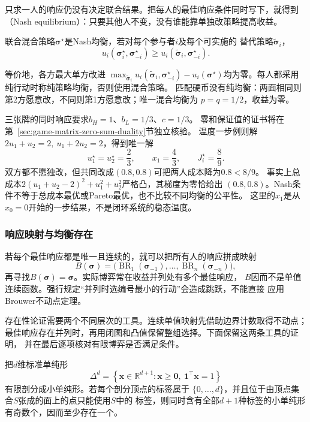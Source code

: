 只求一人的响应仍没有决定联合结果。把每人的最佳响应条件同时写下，就得到
（Nash equilibrium）：只要其他人不变，没有谁能靠单独改策略提高收益。
\begin{definition}[Nash均衡]
\label{def:game-nash-equilibrium}
联合混合策略\(\bm\sigma^\star\)是Nash均衡，若对每个参与者\(i\)及每个可实施的
替代策略\(\widetilde{\bm\sigma}_i\)，
\begin{equation}
  u_i(\bm\sigma_i^\star,\bm\sigma_{-i}^\star)
  \geq u_i(\widetilde{\bm\sigma}_i,\bm\sigma_{-i}^\star).
  \label{eq:game-nash-no-unilateral-deviation}
\end{equation}
\end{definition}
等价地，各方最大单方改进
\(\max_{\widetilde{\bm\sigma}_i}u_i(\widetilde{\bm\sigma}_i,\bm\sigma_{-i}^\star)
-u_i(\bm\sigma^\star)\)均为零。每人都采用纯行动时称纯策略均衡，否则使用混合策略。
匹配硬币没有纯均衡：两面相同则第2方愿意改，不同则第1方愿意改；唯一混合均衡为
\(p=q=1/2\)，收益为零。

三张牌的同时响应要求\(b_H=1\)、\(b_L=1/3\)、\(c=1/3\)。
零和保证值的证书将在第~\ref{sec:game-matrix-zero-sum-duality}节独立核验。
温度一步例则解
\(2u_1+u_2=2,\ u_1+2u_2=2\)，得到唯一解
\[
  u_1^\star=u_2^\star=\frac23,\qquad x_1=\frac43,\qquad J_i^\star=\frac89.
\]
双方都不愿独改，但共同改成\((0.8,0.8)\)可把两人成本降为\(0.8<8/9\)。
事实上总成本\(2(u_1+u_2-2)^2+u_1^2+u_2^2\)严格凸，其梯度为零恰给出
\((0.8,0.8)\)。Nash条件不等于总成本最优或Pareto最优，也不比较不同均衡的公平性。
这里的\(x_1\)是从\(x_0=0\)开始的一步结果，不是闭环系统的稳态温度。

\subsubsection{响应映射与均衡存在}
\label{sec:game-equilibrium-existence}

若每个最佳响应都是唯一且连续的，就可以把所有人的响应拼成映射
\[
  B(\bm{\sigma})
  =
  \bigl(
    \operatorname{BR}_1(\bm{\sigma}_{-1}),\ldots,
    \operatorname{BR}_n(\bm{\sigma}_{-n})
  \bigr),
\]
再寻找\(B(\bm{\sigma})=\bm{\sigma}\)。实际博弈常在收益并列处有多个最佳响应，
\(B\)因而不是单值连续函数。强行规定“并列时选编号最小的行动”会造成跳跃，不能直接
应用Brouwer不动点定理。

存在性论证需要两个不同层次的工具。连续单值映射先借助边界计数取得不动点；
最佳响应存在并列时，再用闭图和凸值保留整组选择。下面保留这两条工具的证明，
并在最后逐项核对有限博弈是否满足条件。
\begin{lemma}[Sperner引理]
\label{lem:game-sperner}
把\(d\)维标准单纯形
\[
  \Delta^d
  =
  \left\{
    \bm{x}\in\mathbb{R}^{d+1}:
    \bm{x}\geq\bm{0},\
    \bm{1}^{\top}\bm{x}=1
  \right\}
\]
有限剖分成小单纯形。若每个剖分顶点的标签属于
\(\{0,\ldots,d\}\)，并且位于由顶点集合\(S\)张成的面上的点只能使用\(S\)中的
标签，则同时含有全部\(d+1\)种标签的小单纯形有奇数个，因而至少存在一个。
\end{lemma}

